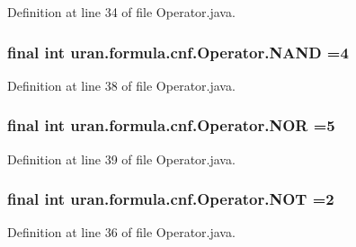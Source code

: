 Definition at line 34 of file Operator.\+java.

\hypertarget{classuran_1_1formula_1_1cnf_1_1_operator_a8bdc77e0c28cfc549be4294e6ea28cbb}{}
\subsubsection[{N\+A\+N\+D}]{\setlength{\rightskip}{0pt plus 5cm}final int uran.\+formula.\+cnf.\+Operator.\+N\+A\+N\+D =4\hspace{0.3cm}{\ttfamily [static]}}\label{classuran_1_1formula_1_1cnf_1_1_operator_a8bdc77e0c28cfc549be4294e6ea28cbb}


Definition at line 38 of file Operator.\+java.

\hypertarget{classuran_1_1formula_1_1cnf_1_1_operator_a54f41b26960fc82d4248547d293c8989}{}
\subsubsection[{N\+O\+R}]{\setlength{\rightskip}{0pt plus 5cm}final int uran.\+formula.\+cnf.\+Operator.\+N\+O\+R =5\hspace{0.3cm}{\ttfamily [static]}}\label{classuran_1_1formula_1_1cnf_1_1_operator_a54f41b26960fc82d4248547d293c8989}


Definition at line 39 of file Operator.\+java.

\hypertarget{classuran_1_1formula_1_1cnf_1_1_operator_ac5089b57e3d7cf6e5bb6e10e2d294c10}{}
\subsubsection[{N\+O\+T}]{\setlength{\rightskip}{0pt plus 5cm}final int uran.\+formula.\+cnf.\+Operator.\+N\+O\+T =2\hspace{0.3cm}{\ttfamily [static]}}\label{classuran_1_1formula_1_1cnf_1_1_operator_ac5089b57e3d7cf6e5bb6e10e2d294c10}


Definition at line 36 of file Operator.\+java.

